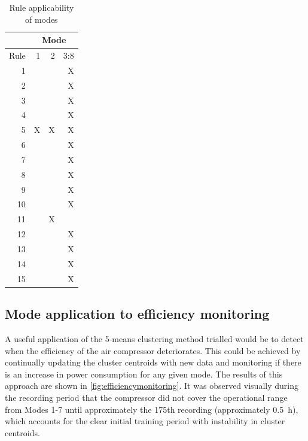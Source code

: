 \begin{table}[htbp]
  \centering
  \caption{Rule applicability of modes}
    \begin{tabular}{r|rrr}
    \toprule
          & \multicolumn{3}{c}{Mode} \\
    \midrule
     Rule & 1     & 2     & 3:8 \\
     \midrule
    1     &       &       & X \\
    2     &       &       & X \\
    3     &       &       & X \\
    4     &       &       & X \\
    5     & X     & X     & X \\
    6     &       &       & X \\
    7     &       &       & X \\
    8     &       &       & X \\
    9     &       &       & X \\
    10    &       &       & X \\
    11    &       & X     &  \\
    12    &       &       & X \\
    13    &       &       & X \\
    14    &       &       & X \\
    15    &       &       & X \\
    \bottomrule
    \end{tabular}%
  \label{tab:modeapplication}%
\end{table}%


\subsection{Mode application to efficiency monitoring}
\label{subsec:modeefficiency}
A useful application of the 5-means clustering method trialled would be to detect when the efficiency of the air compressor deteriorates. This could be achieved by continually updating the cluster centroids with new data and monitoring if there is an increase in power consumption for any given mode. The results of this approach are shown in \autoref{fig:efficiencymonitoring}. It was observed visually during the recording period that the compressor did not cover the operational range from Modes 1-7  until approximately the 175th recording (approximately \SI{0.5}{\hour}), which accounts for the clear initial training period with instability in cluster centroids. 

